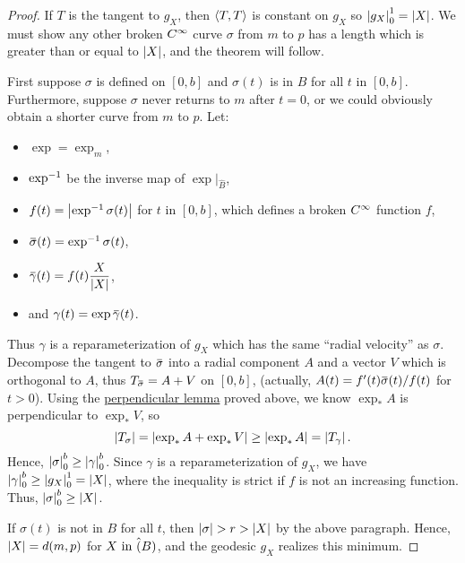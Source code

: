 \documentclass[../main]{subfiles}
\begin{document}
\begin{proof}
    If $T$ is the tangent to $g_X$, then $\left\langle T,T\right\rangle$ is constant on $g_X$ so $\left|g_X\right|_0^1 = \left|X\right|$. We must show any other broken $C^\infty$ curve $\sigma$ from $m$ to $p$ has a length which is greater than or equal to $\left|X\right|$, and the theorem will follow.

    First suppose $\sigma$ is defined on $[0,b]$ and $\sigma(t)$ is in $B$ for all $t$ in $[0,b]$. Furthermore, suppose $\sigma$ never returns to $m$ after $t = 0$, or we could obviously obtain a shorter curve from $m$ to $p$. Let:
    \begin{itemize}
        \item $\exp = \exp_m$,
        \item $\exp^{-1}$ be the inverse map of $\exp|_{\hat{B}}$,
        \item $f(t) = \left|\exp^{-1}\sigma(t)\right|$ for $t$ in $[0,b]$, which defines a broken $C^\infty$ function $f$,
        \item $\xoverline{\sigma}(t) = \exp\inv\sigma(t)$,
        \item $\xoverline{\gamma}(t) = f(t)\dfrac{X}{\norm{X}}$,
        \item and $\gamma(t) = \exp\xoverline{\gamma}(t)$.
    \end{itemize}
    Thus $\gamma$ is a reparameterization of $g_X$ which has the same ``radial velocity'' as $\sigma$. Decompose the tangent to $\xoverline{\sigma}$ into a radial component $A$ and a vector $V$ which is orthogonal to $A$, thus $T_{\xoverline{\sigma}} = A + V$ on $[0,b]$, (actually, $A(t) = f'(t)\xoverline{\sigma}(t)/f(t)$ for $t > 0$). Using the \hyperref[cor:ch10.2.2]{perpendicular lemma} proved above, we know $\exp_\ast A$ is perpendicular to $\exp_\ast V$, so \[\left|T_\sigma\right| = \left|\exp_\ast A + \exp_\ast V\right| \geq \left|\exp_\ast A\right| = \left|T_\gamma\right|.\] Hence, $\left|\sigma\right|_0^b \geq \left|\gamma\right|_0^b$. Since $\gamma$ is a reparameterization of $g_X$, we have $\left|\gamma\right|_0^b \geq \left|g_X\right|_0^1 = \left|X\right|$, where the inequality is strict if $f$ is not an increasing function. Thus, $\left|\sigma\right|_0^b \geq \left|X\right|$.

    If $\sigma(t)$ is not in $B$ for all $t$, then $\left|\sigma\right| > r > \left|X\right|$ by the above paragraph. Hence, $\left|X\right| = d(m, p)$ for $X \text{ in } \hat(B)$, and the geodesic $g_X$ realizes this minimum.
\end{proof}
\end{document}
